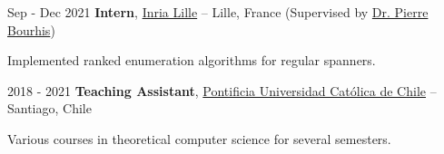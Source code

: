 \vspace{0.2 cm}

\begin{twocolentry}{
    Sep - Dec 2021
}
    \textbf{Intern}, \href{https://www.inria.fr/fr/centre-inria-de-luniversite-de-lille}{Inria Lille} -- Lille, France {\footnotesize (Supervised by \href{https://www.linkedin.com/in/pierre-bourhis-709a1827/?originalSubdomain=fr/}{Dr. Pierre Bourhis})}
\end{twocolentry}

\vspace{0.10 cm}
\begin{onecolentry}
    \begin{highlights}
        \item Implemented ranked enumeration algorithms for regular spanners.
    \end{highlights}
\end{onecolentry}

\vspace{0.2 cm}

\begin{twocolentry}{
    2018 - 2021
}
    \textbf{Teaching Assistant}, \href{https://www.uc.cl/}{Pontificia Universidad Católica de Chile} -- Santiago, Chile\end{twocolentry}

\vspace{0.10 cm}
\begin{onecolentry}
    \begin{highlights}
        \item Various courses in theoretical computer science for several semesters.
    \end{highlights}
\end{onecolentry} 